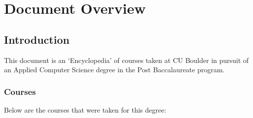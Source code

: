 \clearpage

\newcommand{\ChapTitle}{Document Overview}
\newcommand{\SectionTitle}{Introduction}

\chapter{\ChapTitle}
\section{\SectionTitle}

This document is an `Encyclopedia' of courses taken at CU Boulder in pursuit of an Applied Computer Science degree in the Post Baccalaureate program.

\subsection{Courses}

Below are the courses that were taken for this degree:

